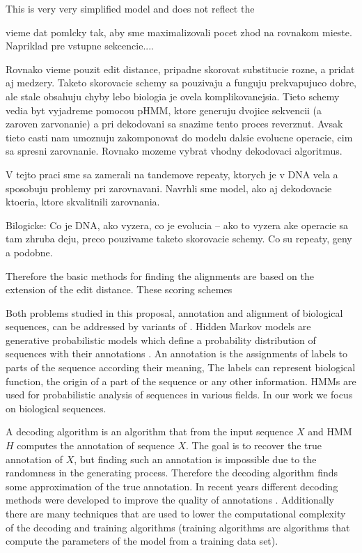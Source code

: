 This is very very simplified model and does not reflect the 
\begin{reformulate*}
vieme dat pomlcky tak, aby sme maximalizovali pocet zhod na rovnakom mieste.
Napriklad pre vstupne sekcencie....

Rovnako vieme pouzit edit distance, pripadne skorovat substitucie rozne, a pridat aj medzery.
Taketo skorovacie schemy sa pouzivaju a funguju prekvapujuco dobre, ale stale obsahuju 
chyby lebo biologia je ovela komplikovanejsia. Tieto schemy vedia byt vyjadreme pomocou 
pHMM, ktore generuju dvojice sekvencii (a zaroven zarvonanie) a pri dekodovani sa
snazime tento proces reverznut. Avsak tieto casti nam umoznuju zakomponovat do
modelu dalsie evolucne operacie, cim sa spresni zarovnanie.
Rovnako mozeme vybrat vhodny dekodovaci algoritmus.

V tejto praci sme sa zamerali na tandemove repeaty, ktorych je v DNA vela a sposobuju problemy pri zarovnavani.
Navrhli sme model, ako aj dekodovacie ktoeria, ktore skvalitnili zarovnania.

Bilogicke:
Co je DNA, ako vyzera, co je evolucia -- ako to vyzera
ake operacie sa tam zhruba deju, preco pouzivame taketo skorovacie schemy.
Co su repeaty, geny a podobne.
\end{reformulate*}
Therefore the
basic methods for finding the alignments are based on the extension of the edit
distance. These scoring schemes 


Both problems studied in this proposal, annotation and alignment of biological
sequences, can be addressed by variants of .  Hidden Markov models are generative probabilistic models which
define a probability distribution of sequences with their annotations
\cite{Durbin1998}. An annotation is the assignments of labels to parts of the
sequence according their meaning, The labels can represent biological function,
the origin of a part of the sequence or any other information. HMMs are used for
probabilistic analysis of sequences in various fields. In our work we focus on
biological sequences. 

A decoding algorithm is an algorithm that from the input sequence $X$ and HMM
$H$ computes the annotation of sequence $X$. The goal is to recover the true
annotation of $X$, but finding such an annotation is impossible due to the
randomness in the generating process. Therefore the decoding algorithm finds
some approximation of the true annotation.  In recent years different decoding
methods were developed to improve the quality of annotations
\cite{Gross2007,Nanasi2010,Nanasi2010mgr,Truszkowski2011}.  Additionally there
are many techniques that are used to lower the computational complexity of the
decoding and training algorithms (training algorithms are algorithms that
compute the parameters of the model from a training data set).

